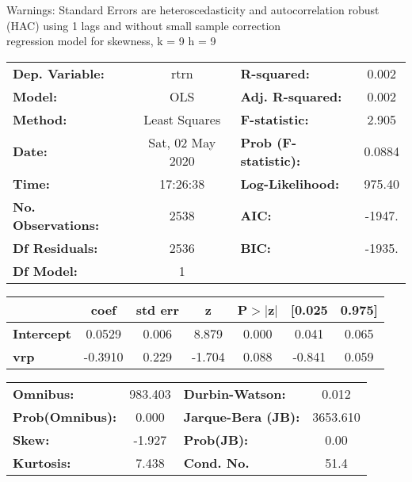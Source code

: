 Warnings: \newline
 [1] Standard Errors are heteroscedasticity and autocorrelation robust (HAC) using 1 lags and without small sample correction\\ 

regression model for skewness, k = 9 h = 9\begin{center}
\begin{tabular}{lclc}
\toprule
\textbf{Dep. Variable:}    &       rtrn       & \textbf{  R-squared:         } &     0.002   \\
\textbf{Model:}            &       OLS        & \textbf{  Adj. R-squared:    } &     0.002   \\
\textbf{Method:}           &  Least Squares   & \textbf{  F-statistic:       } &     2.905   \\
\textbf{Date:}             & Sat, 02 May 2020 & \textbf{  Prob (F-statistic):} &   0.0884    \\
\textbf{Time:}             &     17:26:38     & \textbf{  Log-Likelihood:    } &    975.40   \\
\textbf{No. Observations:} &        2538      & \textbf{  AIC:               } &    -1947.   \\
\textbf{Df Residuals:}     &        2536      & \textbf{  BIC:               } &    -1935.   \\
\textbf{Df Model:}         &           1      & \textbf{                     } &             \\
\bottomrule
\end{tabular}
\begin{tabular}{lcccccc}
                   & \textbf{coef} & \textbf{std err} & \textbf{z} & \textbf{P$> |$z$|$} & \textbf{[0.025} & \textbf{0.975]}  \\
\midrule
\textbf{Intercept} &       0.0529  &        0.006     &     8.879  &         0.000        &        0.041    &        0.065     \\
\textbf{vrp}       &      -0.3910  &        0.229     &    -1.704  &         0.088        &       -0.841    &        0.059     \\
\bottomrule
\end{tabular}
\begin{tabular}{lclc}
\textbf{Omnibus:}       & 983.403 & \textbf{  Durbin-Watson:     } &    0.012  \\
\textbf{Prob(Omnibus):} &   0.000 & \textbf{  Jarque-Bera (JB):  } & 3653.610  \\
\textbf{Skew:}          &  -1.927 & \textbf{  Prob(JB):          } &     0.00  \\
\textbf{Kurtosis:}      &   7.438 & \textbf{  Cond. No.          } &     51.4  \\
\bottomrule
\end{tabular}
\end{center}


